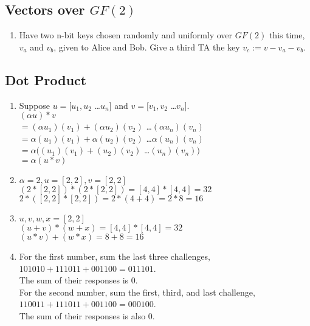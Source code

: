 \documentclass{article}
\begin{document}
    \subsection{Vectors over $GF(2)$}
    \begin{enumerate}
        \addtocounter{enumi}{2}
        \item Have two n-bit keys chosen randomly and uniformly over $GF(2)$ this
            time, $v_a$ and $v_b$, given to Alice and Bob. Give a third TA the key
            $v_c := v - v_a - v_b$.
    \end{enumerate}
    \subsection{Dot Product}
    \begin{enumerate}
        \addtocounter{enumi}{22}
        \item Suppose $u = [u_1, u_2$ \ldots $u_n]$ and $v = [v_1, v_2$ \ldots $v_n]$. \\
            $(\alpha u) * v$ \\
            $= (\alpha u_1)(v_1) + (\alpha u_2)(v_2)$ \ldots $(\alpha u_n)(v_n)$ \\
            $= \alpha (u_1)(v_1) + \alpha (u_2)(v_2)$ \ldots $\alpha (u_n)(v_n)$ \\
            $= \alpha ((u_1)(v_1) + (u_2)(v_2)$ \ldots $(u_n)(v_n))$ \\
            $= \alpha (u * v)$
        \item $\alpha = 2, u = [2,2], v = [2,2]$ \\
            $(2 * [2,2]) * (2 * [2,2]) = [4,4] * [4,4] = 32$ \\
            $2 * ([2,2] * [2,2]) = 2 * (4 + 4) = 2 * 8 = 16$
        \item $u,v,w,x = [2,2]$ \\
            $(u + v) * (w + x) = [4,4] * [4,4] = 32$ \\
            $(u * v) + (w * x) = 8 + 8 = 16$
        \addtocounter{enumi}{2}
        \item For the first number, sum the last three challenges, $101010 + 111011 + 001100 = 011101$. \\
            The sum of their responses is 0. \\
            For the second number, sum the first, third, and last challenge,
            $110011 + 111011 + 001100 = 000100$. \\
            The sum of their responses is also 0.
    \end{enumerate}
\end{document}
